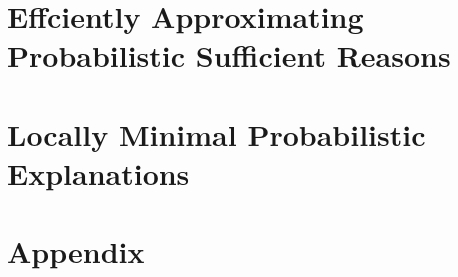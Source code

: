 \documentclass[letterpaper]{article} %
\begin{document}
\section{Effciently Approximating Probabilistic Sufficient Reasons}
\label{sec-comp-problem}


\section{Locally Minimal Probabilistic Explanations}
\label{sec-loc-min}




\newpage
\onecolumn
\appendix
\section*{Appendix}


\end{document}
